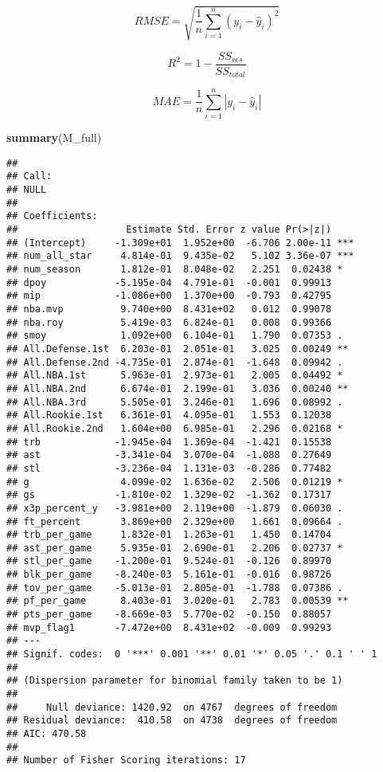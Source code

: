 \documentclass[
  11pt,
]{article}
\newenvironment{Shaded}{\begin{snugshade}}{\end{snugshade}}
\newcommand{\FunctionTok}[1]{\textcolor[rgb]{0.13,0.29,0.53}{\textbf{#1}}}
\newcommand{\NormalTok}[1]{#1}
\begin{document}
\[RMSE = \sqrt{\frac{1}{n} \sum_{i=1}^{n}(y_i - \hat{y}_i)^2}\]

\[R^2 = 1- \frac{SS_{res}}{SS_{total}}\]

\[MAE = \frac{1}{n} \sum_{i=1}^{n} |y_i - \hat{y}_i|\]

\begin{Shaded}
\begin{Highlighting}[]
\FunctionTok{summary}\NormalTok{(M\_full)}
\end{Highlighting}
\end{Shaded}

\begin{verbatim}
## 
## Call:
## NULL
## 
## Coefficients:
##                   Estimate Std. Error z value Pr(>|z|)    
## (Intercept)     -1.309e+01  1.952e+00  -6.706 2.00e-11 ***
## num_all_star     4.814e-01  9.435e-02   5.102 3.36e-07 ***
## num_season       1.812e-01  8.048e-02   2.251  0.02438 *  
## dpoy            -5.195e-04  4.791e-01  -0.001  0.99913    
## mip             -1.086e+00  1.370e+00  -0.793  0.42795    
## nba.mvp          9.740e+00  8.431e+02   0.012  0.99078    
## nba.roy          5.419e-03  6.824e-01   0.008  0.99366    
## smoy             1.092e+00  6.104e-01   1.790  0.07353 .  
## All.Defense.1st  6.203e-01  2.051e-01   3.025  0.00249 ** 
## All.Defense.2nd -4.735e-01  2.874e-01  -1.648  0.09942 .  
## All.NBA.1st      5.963e-01  2.973e-01   2.005  0.04492 *  
## All.NBA.2nd      6.674e-01  2.199e-01   3.036  0.00240 ** 
## All.NBA.3rd      5.505e-01  3.246e-01   1.696  0.08992 .  
## All.Rookie.1st   6.361e-01  4.095e-01   1.553  0.12038    
## All.Rookie.2nd   1.604e+00  6.985e-01   2.296  0.02168 *  
## trb             -1.945e-04  1.369e-04  -1.421  0.15538    
## ast             -3.341e-04  3.070e-04  -1.088  0.27649    
## stl             -3.236e-04  1.131e-03  -0.286  0.77482    
## g                4.099e-02  1.636e-02   2.506  0.01219 *  
## gs              -1.810e-02  1.329e-02  -1.362  0.17317    
## x3p_percent_y   -3.981e+00  2.119e+00  -1.879  0.06030 .  
## ft_percent       3.869e+00  2.329e+00   1.661  0.09664 .  
## trb_per_game     1.832e-01  1.263e-01   1.450  0.14704    
## ast_per_game     5.935e-01  2.690e-01   2.206  0.02737 *  
## stl_per_game    -1.200e-01  9.524e-01  -0.126  0.89970    
## blk_per_game    -8.240e-03  5.161e-01  -0.016  0.98726    
## tov_per_game    -5.013e-01  2.805e-01  -1.788  0.07386 .  
## pf_per_game      8.403e-01  3.020e-01   2.783  0.00539 ** 
## pts_per_game    -8.669e-03  5.770e-02  -0.150  0.88057    
## mvp_flag1       -7.472e+00  8.431e+02  -0.009  0.99293    
## ---
## Signif. codes:  0 '***' 0.001 '**' 0.01 '*' 0.05 '.' 0.1 ' ' 1
## 
## (Dispersion parameter for binomial family taken to be 1)
## 
##     Null deviance: 1420.92  on 4767  degrees of freedom
## Residual deviance:  410.58  on 4738  degrees of freedom
## AIC: 470.58
## 
## Number of Fisher Scoring iterations: 17
\end{verbatim}
\end{document}
